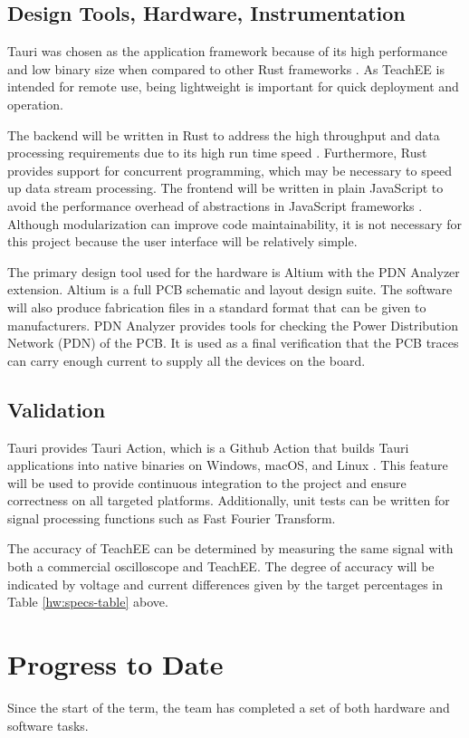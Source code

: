 \documentclass[letterpaper,12pt]{article}
\begin{document}
\subsection{Design Tools, Hardware, Instrumentation}
Tauri was chosen as the application framework because of its high performance
and low binary size when compared to other Rust frameworks 
\cite{tauri_benchmarks}. As TeachEE is intended for remote use, being
lightweight is important for quick deployment and operation.

The backend will be written in Rust to address the high throughput and
data processing requirements due to its high run time speed \cite{rust_speed}.
Furthermore, Rust provides support for concurrent programming, which may be
necessary to speed up data stream processing. The frontend will be written in
plain JavaScript to avoid the performance overhead of abstractions in
JavaScript frameworks \cite{javascript_speed}. Although modularization can
improve code maintainability, it is not necessary for this project because the
user interface will be relatively simple.

The primary design tool used for the hardware is Altium with the PDN Analyzer
extension. Altium is a full PCB schematic and layout design suite. The software
will also produce fabrication files in a standard format that can be given to
manufacturers. PDN Analyzer provides tools for checking the Power Distribution
Network (PDN) of the PCB. It is used as a final verification that the PCB
traces can carry enough current to supply all the devices on the board.

\subsection{Validation}
Tauri provides Tauri Action, which is a Github Action that builds Tauri
applications into native binaries on Windows, macOS, and Linux
\cite{tauri_actions}. This feature will be used to provide continuous integration
to the project and ensure correctness on all targeted platforms. Additionally, unit
tests can be written for signal processing functions such as Fast Fourier Transform.

The accuracy of TeachEE can be determined by measuring the same signal with both a
commercial oscilloscope and TeachEE.
The degree of accuracy will be indicated by voltage and current differences
given by the target percentages in Table \ref{hw:specs-table} above.

\section{Progress to Date} %
Since the start of the term, the team has completed a set of both hardware and
software tasks.
\end{document}
